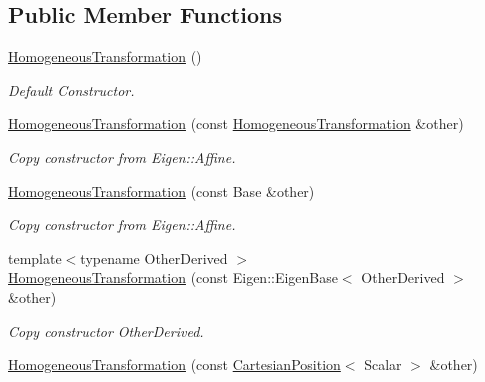 \subsection*{Public Member Functions}
\begin{DoxyCompactItemize}
\item 
\hyperlink{classow__core_1_1HomogeneousTransformation_a6a2d52fc4ee38abbe480a6d5a8e5c773}{Homogeneous\+Transformation} ()\hypertarget{classow__core_1_1HomogeneousTransformation_a6a2d52fc4ee38abbe480a6d5a8e5c773}{}\label{classow__core_1_1HomogeneousTransformation_a6a2d52fc4ee38abbe480a6d5a8e5c773}

\begin{DoxyCompactList}\small\item\em Default Constructor. \end{DoxyCompactList}\item 
\hyperlink{classow__core_1_1HomogeneousTransformation_a57b741e036fe2b71942e724132a76302}{Homogeneous\+Transformation} (const \hyperlink{classow__core_1_1HomogeneousTransformation}{Homogeneous\+Transformation} \&other)\hypertarget{classow__core_1_1HomogeneousTransformation_a57b741e036fe2b71942e724132a76302}{}\label{classow__core_1_1HomogeneousTransformation_a57b741e036fe2b71942e724132a76302}

\begin{DoxyCompactList}\small\item\em Copy constructor from Eigen\+::\+Affine. \end{DoxyCompactList}\item 
\hyperlink{classow__core_1_1HomogeneousTransformation_ac1d8792424c0af25dffd0c7e38981caa}{Homogeneous\+Transformation} (const Base \&other)
\begin{DoxyCompactList}\small\item\em Copy constructor from Eigen\+::\+Affine. \end{DoxyCompactList}\item 
{\footnotesize template$<$typename Other\+Derived $>$ }\\\hyperlink{classow__core_1_1HomogeneousTransformation_a453016dcb8a706ffb95abfd60a70f1df}{Homogeneous\+Transformation} (const Eigen\+::\+Eigen\+Base$<$ Other\+Derived $>$ \&other)
\begin{DoxyCompactList}\small\item\em Copy constructor Other\+Derived. \end{DoxyCompactList}\item 
\hyperlink{classow__core_1_1HomogeneousTransformation_ac3b9cb269c2bdea5b3d7e606cd1ee25f}{Homogeneous\+Transformation} (const \hyperlink{classow__core_1_1CartesianPosition}{Cartesian\+Position}$<$ Scalar $>$ \&other)\hypertarget{classow__core_1_1HomogeneousTransformation_ac3b9cb269c2bdea5b3d7e606cd1ee25f}{}\label{classow__core_1_1HomogeneousTransformation_ac3b9cb269c2bdea5b3d7e606cd1ee25f}


\end{DoxyCompactItemize}
